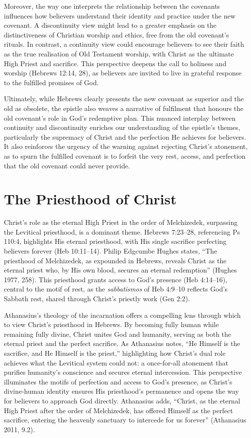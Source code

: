 \documentclass[12pt]{article}
\begin{document}
Moreover, the way one interprets the relationship between the covenants
influences how believers understand their identity and practice under the new
covenant. A discontinuity view might lead to a greater emphasis on the
distinctiveness of Christian worship and ethics, free from the old covenant’s
rituals. In contrast, a continuity view could encourage believers to see their
faith as the true realisation of Old Testament worship, with Christ as the
ultimate High Priest and sacrifice. This perspective deepens the call to
holiness and worship (Hebrews 12:14, 28), as believers are invited to live in
grateful response to the fulfilled promises of God.

Ultimately, while Hebrews clearly presents the new covenant as superior and the
old as obsolete, the epistle also weaves a narrative of fulfilment that honours
the old covenant’s role in God’s redemptive plan. This nuanced interplay between
continuity and discontinuity enriches our understanding of the epistle’s themes,
particularly the supremacy of Christ and the perfection He achieves for
believers. It also reinforces the urgency of the warning against rejecting
Christ’s atonement, as to spurn the fulfilled covenant is to forfeit the very
rest, access, and perfection that the old covenant could never provide.

\section{The Priesthood of Christ}
Christ’s role as the eternal High Priest in the order of Melchizedek, surpassing
the Levitical priesthood, is a dominant theme. Hebrews 7:23--28, referencing Ps
110:4, highlights His eternal priesthood, with His single sacrifice perfecting
believers forever (Heb 10:11--14). Philip Edgcumbe Hughes states, ``The
priesthood of Melchizedek, as expounded in Hebrews, reveals Christ as the
eternal priest who, by His own blood, secures an eternal redemption'' (Hughes
1977, 258). This priesthood grants access to God’s presence (Heb 4:14--16),
central to the motif of rest, as the \textit{sabbatismos} of Heb 4:9--10
reflects God’s Sabbath rest, shared through Christ’s priestly work (Gen 2:2).

Athanasius’s theology of the incarnation offers a compelling lens through which
to view Christ’s priesthood in Hebrews. By becoming fully human while remaining
fully divine, Christ unites God and humanity, serving as both the eternal priest
and the perfect sacrifice. As Athanasius notes, ``He Himself is the sacrifice,
and He Himself is the priest,'' highlighting how Christ’s dual role achieves
what the Levitical system could not: a once-for-all atonement that purifies
humanity’s conscience and secures eternal intercession. This perspective
illuminates the motifs of perfection and access to God’s presence, as Christ’s
divine-human identity ensures His priesthood’s permanence and opens the way for
believers to approach God directly. Athanasius adds, ``Christ, as the eternal
High Priest after the order of Melchizedek, has offered Himself as the perfect
sacrifice, entering the heavenly sanctuary to intercede for us forever''
(Athanasius 2011, 9.2).
\end{document}
